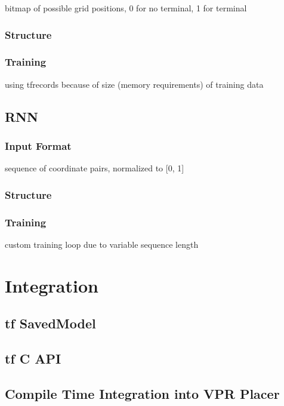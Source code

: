 bitmap of possible grid positions, 0 for no terminal, 1 for terminal

\subsubsection{Structure}

\subsubsection{Training}

using tfrecords because of size (memory requirements) of training data

\subsection{\gls{RNN}}

\subsubsection{Input Format}

sequence of coordinate pairs, normalized to [0, 1]

\subsubsection{Structure}

\subsubsection{Training}

custom training loop due to variable sequence length

\section{Integration}

\subsection{\gls{tf} SavedModel}

\subsection{\gls{tf} C API}

\subsection{Compile Time Integration into VPR Placer}
